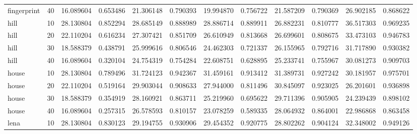 \begin{tabular}{lrrrrrrrrrrr}
 fingerprint &     40 &   16.089604 &    0.653486 &             21.306148 &              0.790393 &        19.994870 &         0.756722 &         21.587209 &          0.790369 &          26.902185 &           0.868622 \\
        hill &     10 &   28.130804 &    0.852294 &             28.685149 &              0.888989 &        28.886714 &         0.889911 &         26.882231 &          0.810777 &          36.517303 &           0.969235 \\
        hill &     20 &   22.110204 &    0.616234 &             27.307421 &              0.851709 &        26.610949 &         0.813668 &         26.699601 &          0.808675 &          33.473103 &           0.946783 \\
        hill &     30 &   18.588379 &    0.438791 &             25.999616 &              0.806546 &        24.462303 &         0.721337 &         26.155965 &          0.792716 &          31.717890 &           0.930382 \\
        hill &     40 &   16.089604 &    0.320104 &             24.754319 &              0.754284 &        22.608751 &         0.628895 &         25.233741 &          0.755967 &          30.081273 &           0.909703 \\
       house &     10 &   28.130804 &    0.789496 &             31.724123 &              0.942367 &        31.459161 &         0.913412 &         31.389731 &          0.927242 &          30.181957 &           0.975701 \\
       house &     20 &   22.110204 &    0.519164 &             29.903044 &              0.908633 &        27.944000 &         0.811496 &         30.845097 &          0.923025 &          26.201601 &           0.936898 \\
       house &     30 &   18.588379 &    0.354919 &             28.160921 &              0.863711 &        25.219960 &         0.695622 &         29.711396 &          0.905905 &          24.239439 &           0.898102 \\
       house &     40 &   16.089604 &    0.257315 &             26.578593 &              0.810157 &        23.078259 &         0.589335 &         28.064932 &          0.864001 &          22.986868 &           0.863458 \\
        lena &     10 &   28.130804 &    0.830123 &             29.194755 &              0.930906 &        29.454352 &         0.920775 &         28.802262 &          0.904124 &          32.348002 &           0.949126 \\

\end{tabular}
